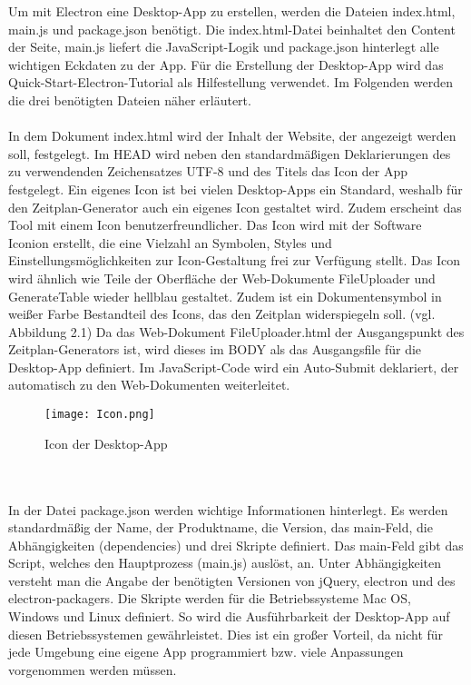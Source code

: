 {Um mit Electron eine Desktop-App zu erstellen, werden die Dateien index.html, main.js und package.json benötigt. Die index.html-Datei beinhaltet den Content der Seite, main.js liefert die JavaScript-Logik und package.json hinterlegt alle wichtigen Eckdaten zu der App. Für die Erstellung der Desktop-App wird das Quick-Start-Electron-Tutorial als Hilfestellung verwendet.  Im Folgenden werden die drei benötigten Dateien näher erläutert.\\
\\
In dem Dokument index.html wird der Inhalt der Website, der angezeigt werden soll, festgelegt.
Im HEAD wird neben den standardmäßigen Deklarierungen des zu verwendenden Zeichensatzes UTF-8 und des Titels das Icon der App festgelegt. Ein eigenes Icon ist bei vielen Desktop-Apps ein Standard, weshalb für den Zeitplan-Generator auch ein eigenes Icon gestaltet wird. Zudem erscheint das Tool mit einem Icon benutzerfreundlicher. Das Icon wird mit der Software Iconion erstellt, die eine Vielzahl an Symbolen, Styles und Einstellungsmöglichkeiten zur Icon-Gestaltung frei zur Verfügung stellt.  Das Icon wird ähnlich wie Teile der Oberfläche der Web-Dokumente FileUploader und GenerateTable wieder hellblau gestaltet. Zudem ist ein Dokumentensymbol in weißer Farbe Bestandteil des Icons, das den Zeitplan widerspiegeln soll. (vgl. Abbildung 2.1)
Da das Web-Dokument FileUploader.html der Ausgangspunkt des Zeitplan-Generators ist, wird dieses im BODY als das Ausgangsfile für die Desktop-App definiert. Im JavaScript-Code wird ein Auto-Submit deklariert, der automatisch zu den Web-Dokumenten weiterleitet. 
\begin{figure}[htbp]
  \centering
  \texttt{[image: Icon.png]}
  \caption{Icon der Desktop-App}
  \label{fig:Fig1}
\end{figure}\\
\\
In der Datei package.json werden wichtige Informationen hinterlegt. Es werden standardmäßig der Name, der Produktname, die Version, das main-Feld, die Abhängigkeiten (dependencies) und drei Skripte definiert. Das main-Feld gibt das Script, welches den Hauptprozess (main.js) auslöst, an. Unter Abhängigkeiten versteht man die Angabe der benötigten Versionen von jQuery, electron und des electron-packagers. Die Skripte werden für die Betriebssysteme Mac OS, Windows und Linux definiert. So wird die Ausführbarkeit der Desktop-App auf diesen Betriebssystemen gewährleistet. Dies ist ein großer Vorteil, da nicht für jede Umgebung eine eigene App programmiert bzw. viele Anpassungen vorgenommen werden müssen.\\
}
